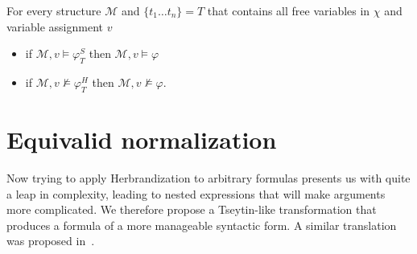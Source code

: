 \documentclass[a4paper,UKenglish,cleveref, autoref, thm-restate]{lipics-v2021}
\begin{document}
\begin{lemma}\label{ap2}
	For every structure $\mathcal M$ and $\{t_1\dots t_n\} = T$ that contains all free variables in $\chi$ and variable assignment $v$
	\begin{itemize}
		\item if $\mathcal M, v\models\varphi^S_T$ then $\mathcal M, v\models \varphi$
		\item if $\mathcal M, v\not\models\varphi^H_T$ then $\mathcal M, v\not\models\varphi$.
	\end{itemize}
\end{lemma}



\section{Equivalid normalization}

Now trying to apply Herbrandization to arbitrary formulas presents us with quite a leap in complexity, leading to nested expressions that will make arguments more complicated. We therefore propose a Tseytin-like transformation that produces a formula of a more manageable syntactic form. A similar translation was proposed in~\cite{statman1979intuitionistic}.
\end{document}
